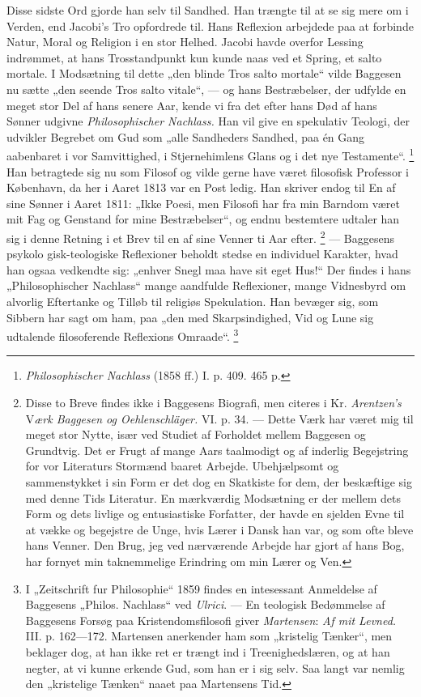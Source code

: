 \documentclass[12pt,a4paper,openany]{book}
\newcommand{\opage}[1]{\marginnote{\footnotesize\textit{[#1]}}}
\begin{document}
Disse sidste Ord gjorde han selv til Sandhed. Han trængte til at se sig mere om
i Verden, end Jacobi's Tro opfordrede til. Hans Reflexion arbejdede paa at
forbinde Natur, Moral og Religion i en stor Helhed. Jacobi havde overfor
Lessing indrømmet, at hans Trosstandpunkt kun kunde naas ved et Spring, et
salto mortale. I Modsætning til dette „den blinde Tros salto mortale“ vilde
Baggesen nu sætte „den seende Tros salto vitale“, --- og hans Bestræbelser, der
udfylde en meget stor Del af hans senere Aar, kende vi fra det efter hans Død
af hans Sønner udgivne \textit{Philosophischer Nachlass.} Han vil give en
spekulativ Teologi, der udvikler Begrebet om Gud som „alle Sandheders Sandhed,
paa én Gang aabenbaret i vor Samvittighed, i Stjernehimlens Glans og i det nye
Testamente“.%
\footnote[1]{\textit{Philosophischer Nachlass} (1858 ff.) I. p. 409. 465 p.}
Han betragtede sig nu som Filosof og vilde gerne have været filosofisk
Professor i København, da her i Aaret 1813 var en Post ledig. Han skriver endog
til En af sine Sønner i Aaret 1811: „Ikke Poesi, men Filosofi har fra min
Barndom været mit Fag og Genstand for mine Bestræbelser“, og endnu bestemtere
udtaler han sig i denne Retning i et Brev til en af sine Venner ti Aar efter.%
\footnote[2]{Disse to Breve findes ikke i Baggesens Biografi, men citeres i Kr.
\emph{Arentzen's} V\textit{ærk Baggesen og Oehlenschläger.} VI. p. 34. ---
Dette Værk har været mig til meget stor Nytte, især ved Studiet af Forholdet
mellem Baggesen og Grundtvig. Det er Frugt af mange Aars taalmodigt og af
inderlig Begejstring for vor Literaturs Stormænd baaret Arbejde. Ubehjælpsomt
og sammenstykket i sin Form er det dog en Skatkiste for dem, der beskæftige sig
med denne Tids Literatur. En mærkværdig Modsætning er der mellem dets Form og
dets livlige og entusiastiske Forfatter, der havde en sjelden Evne til at vække
og begejstre de Unge, hvis Lærer i Dansk han var, og som ofte bleve hans
Venner. Den Brug, jeg ved nærværende Arbejde har gjort af hans Bog, har fornyet
min taknemmelige Erindring om min Lærer og Ven.} --- Baggesens psykolo%
\setcounter{footnote}{0}%
\opage{68}gisk-teologiske Reflexioner beholdt stedse en individuel Karakter,
hvad han ogsaa vedkendte sig: „enhver Snegl maa have sit eget Hus!“ Der findes
i hans „Philosophischer Nachlass“ mange aandfulde Reflexioner, mange Vidnesbyrd
om alvorlig Eftertanke og Tilløb til religiøs Spekulation. Han bevæger sig, som
Sibbern har sagt om ham, paa „den med Skarpsindighed, Vid og Lune sig udtalende
filosoferende Reflexions Omraade“.%
\footnote[1]{I „Zeitschrift fur Philosophie“ 1859 findes en intesessant
Anmeldelse af Baggesens „Philos. Nachlass“ ved \emph{Ulrici}. --- En teologisk
Bedømmelse af Baggesens Forsøg paa Kristendomsfilosofi giver \emph{Martensen}:
\textit{Af mit Levned.} III. p. 162---172. Martensen anerkender ham som
„kristelig Tænker“, men beklager dog, at han ikke ret er trængt ind i
Treenighedslæren, og at han negter, at vi kunne erkende Gud, som han er i sig
selv. Saa langt var nemlig den „kristelige Tænken“ naaet paa Martensens Tid.}
\end{document}
